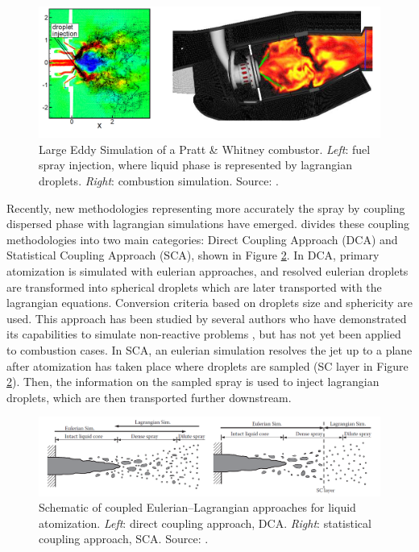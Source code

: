 \begin{figure}[h!]
	\centering
   \includegraphics[scale=0.45]{./part0_intro/reactive_LES_combustor_Moin}
	\caption[Large Eddy Simulation of a Pratt \& Whitney combustor.]{Large Eddy Simulation of a Pratt \& Whitney combustor. \textsl{Left}: fuel spray injection, where liquid phase is represented by lagrangian droplets. \textsl{Right}: combustion simulation. Source: .}
	\label{fig:reactive_LES_combustor_Moin}
\end{figure}

Recently, new methodologies representing more accurately the spray by coupling dispersed phase with lagrangian simulations have emerged.  divides these coupling methodologies into two main categories: Direct Coupling Approach (DCA) and Statistical Coupling Approach (SCA), shown in Figure \ref{fig:coupled_EE_EL_approaches_Michaelides}. In DCA, primary atomization is simulated with eulerian approaches, and resolved eulerian droplets are transformed into spherical droplets which are later transported with the lagrangian equations. Conversion criteria based on droplets size and sphericity are used. This approach has been studied by several authors who have demonstrated its capabilities to simulate non-reactive problems , but has not yet been applied to combustion cases. In SCA, an eulerian simulation resolves the jet up to a plane after atomization has taken place where droplets are sampled (SC layer in Figure \ref{fig:coupled_EE_EL_approaches_Michaelides}). Then, the information on the sampled spray is used to inject lagrangian droplets, which are then transported further downstream.

\begin{figure}[h!]
	\centering
   \includegraphics[scale=0.5]{./part0_intro/coupled_EE_EL_approaches_Michaelides}
	\caption[Schematic of coupled Eulerian–Lagrangian approaches for liquid atomization.]{Schematic of coupled Eulerian–Lagrangian approaches for liquid atomization. \textsl{Left}: direct coupling approach, DCA. \textsl{Right}: statistical coupling approach, SCA. Source: .}
	\label{fig:coupled_EE_EL_approaches_Michaelides}
\end{figure}

